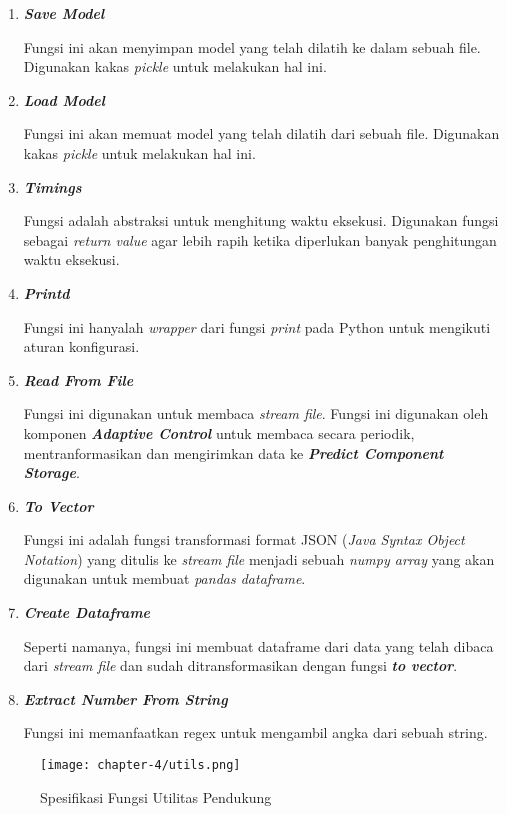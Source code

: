 \begin{enumerate}
    \item \textbf{\textit{Save Model}}
    
    Fungsi ini akan menyimpan model yang telah dilatih ke dalam sebuah file. Digunakan kakas \textit{pickle} untuk melakukan hal ini.

    \item \textbf{\textit{Load Model}}
    
    Fungsi ini akan memuat model yang telah dilatih dari sebuah file. Digunakan kakas \textit{pickle} untuk melakukan hal ini.

    \item \textbf{\textit{Timings}}
    
    Fungsi adalah abstraksi untuk menghitung waktu eksekusi. Digunakan fungsi sebagai \textit{return value} agar lebih rapih ketika diperlukan banyak penghitungan waktu eksekusi.

    \item \textbf{\textit{Printd}}
    
    Fungsi ini hanyalah \textit{wrapper} dari fungsi \textit{print} pada Python untuk mengikuti aturan konfigurasi.

    \item \textbf{\textit{Read From File}}
    
    Fungsi ini digunakan untuk membaca \textit{stream file}. Fungsi ini digunakan oleh komponen \textbf{\textit{Adaptive Control}} untuk membaca secara periodik, mentranformasikan dan mengirimkan data ke \textbf{\textit{Predict Component Storage}}.

    \item \textbf{\textit{To Vector}}
    
    Fungsi ini adalah fungsi transformasi format JSON (\textit{Java Syntax Object Notation}) yang ditulis ke \textit{stream file} menjadi sebuah \textit{numpy array} yang akan digunakan untuk membuat \textit{pandas dataframe}.

    \item \textbf{\textit{Create Dataframe}}
    
    Seperti namanya, fungsi ini membuat dataframe dari data yang telah dibaca dari \textit{stream file} dan sudah ditransformasikan dengan fungsi \textbf{\textit{to vector}}.

    \item \textbf{\textit{Extract Number From String}}
    
    Fungsi ini memanfaatkan regex untuk mengambil angka dari sebuah string.
\end{enumerate}

\begin{figure}[h]
    \centering
    \texttt{[image: chapter-4/utils.png]}
    \caption{Spesifikasi Fungsi Utilitas Pendukung}
    \label{fig:util-spek}
\end{figure}